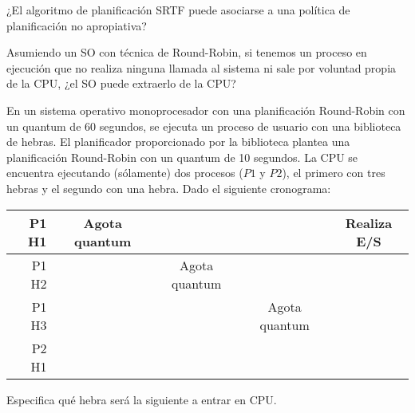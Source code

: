 \documentclass[12pt]{article}
\begin{document}
    \begin{ejercicio}
        ¿El algoritmo de planificación SRTF puede asociarse a una política de planificación no apropiativa?
    \end{ejercicio}

    \begin{ejercicio}
        Asumiendo un SO con técnica de Round-Robin, si tenemos un proceso en ejecución que no realiza ninguna llamada al sistema ni sale por voluntad propia de la CPU, ¿el SO puede extraerlo de la CPU?
    \end{ejercicio}

    \begin{ejercicio}
        En un sistema operativo monoprocesador con una planificación Round-Robin con un quantum de 60 segundos, se ejecuta un proceso de usuario con una biblioteca de hebras. El planificador proporcionado por la biblioteca plantea una planificación Round-Robin con un quantum de 10 segundos. La CPU se encuentra ejecutando (sólamente) dos procesos ($P1$ y $P2$), el primero con tres hebras y el segundo con una hebra. Dado el siguiente cronograma:\\

        \begin{tabular}{|r|c|c|c|c|}
            \hline
            P1 H1 & Agota quantum & & & Realiza E/S \\
            \hline
            P1 H2 & & Agota quantum & & \\
            \hline
            P1 H3 & & & Agota quantum & \\
            \hline
            P2 H1 & & & & \\
            \hline
        \end{tabular}
    \end{ejercicio}

    \noindent
    Especifica qué hebra será la siguiente a entrar en CPU.
\end{document}

